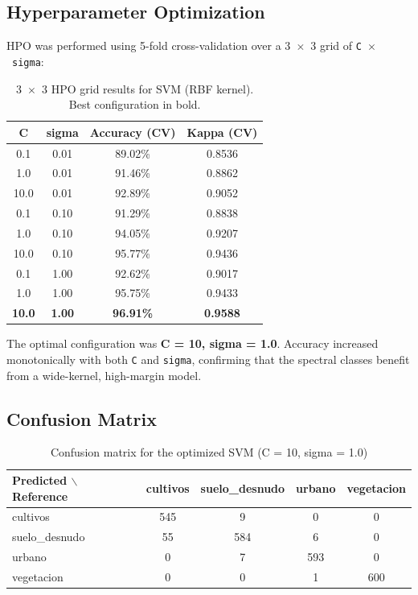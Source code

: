 \documentclass[12pt,a4paper]{article}
\begin{document}
\subsection{Hyperparameter Optimization}

HPO was performed using 5-fold cross-validation over a 3~$\times$~3 grid of \texttt{C}~$\times$~\texttt{sigma}:

\begin{table}[H]
\centering
\begin{tabular}{|c|c|c|c|}
\hline
\textbf{C} & \textbf{sigma} & \textbf{Accuracy (CV)} & \textbf{Kappa (CV)} \\
\hline
 0.1 & 0.01 & 89.02\% & 0.8536 \\
 1.0 & 0.01 & 91.46\% & 0.8862 \\
10.0 & 0.01 & 92.89\% & 0.9052 \\
 0.1 & 0.10 & 91.29\% & 0.8838 \\
 1.0 & 0.10 & 94.05\% & 0.9207 \\
10.0 & 0.10 & 95.77\% & 0.9436 \\
 0.1 & 1.00 & 92.62\% & 0.9017 \\
 1.0 & 1.00 & 95.75\% & 0.9433 \\
\textbf{10.0} & \textbf{1.00} & \textbf{96.91\%} & \textbf{0.9588} \\
\hline
\end{tabular}
\caption{3~$\times$~3 HPO grid results for SVM (RBF kernel). Best configuration in bold.}
\end{table}

The optimal configuration was \textbf{C = 10, sigma = 1.0}. Accuracy increased monotonically with both \texttt{C} and \texttt{sigma}, confirming that the spectral classes benefit from a wide-kernel, high-margin model.

\subsection{Confusion Matrix}

\begin{table}[H]
\centering
\begin{tabular}{|l|c|c|c|c|}
\hline
\textbf{Predicted $\backslash$ Reference} & \textbf{cultivos} & \textbf{suelo\_desnudo} & \textbf{urbano} & \textbf{vegetacion} \\
\hline
cultivos       & 545 &  9 & 0 & 0 \\
\hline
suelo\_desnudo &  55 & 584 & 6 & 0 \\
\hline
urbano         &   0 &  7 & 593 & 0 \\
\hline
vegetacion     &   0 &  0 &  1 & 600 \\
\hline
\end{tabular}
\caption{Confusion matrix for the optimized SVM (C = 10, sigma = 1.0)}
\end{table}
\end{document}
